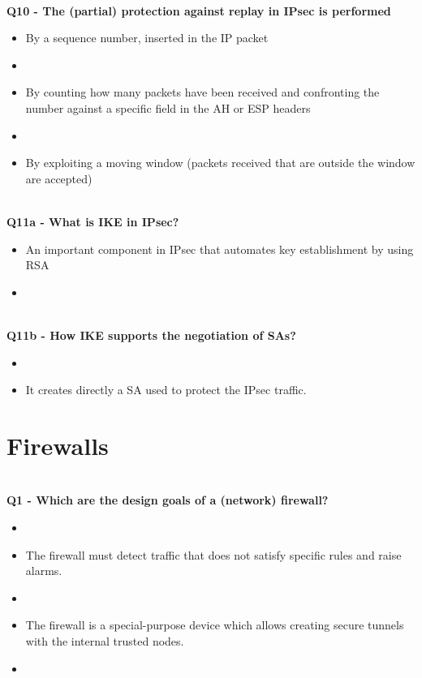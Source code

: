 \textbf{\\Q10 - The (partial) protection against replay in IPsec is performed}
\begin{itemize}
	\item[A.] By a sequence number, inserted in the IP packet
	\item[B.] 
	\item[C.] By counting how many packets have been received and confronting the number against a specific field in the AH or ESP headers
	\item[D.] 
	\item[E.] By exploiting a moving window (packets received that are outside the window are accepted)
\end{itemize}

\textbf{\\Q11a - What is IKE in IPsec?}
\begin{itemize}
	\item[A.] An important component in IPsec that automates key establishment by using RSA
	\item[B.] 
\end{itemize}
\textbf{\\Q11b - How IKE supports the negotiation of SAs?}
\begin{itemize}
	\item[A.] 
	\item[B.] It creates directly a SA used to protect the IPsec traffic.
\end{itemize}
\com{}

\section{Firewalls}

\textbf{\\Q1 - Which are the design goals of a (network) firewall?}
\begin{itemize}
	\item[A.] 
	\item[B.] The firewall must detect traffic that does not satisfy specific rules and raise alarms.
	\item[C.] 
	\item[D.] The firewall is a special-purpose device which allows creating secure tunnels with the internal trusted nodes.
	\item[E.] 
\end{itemize}

